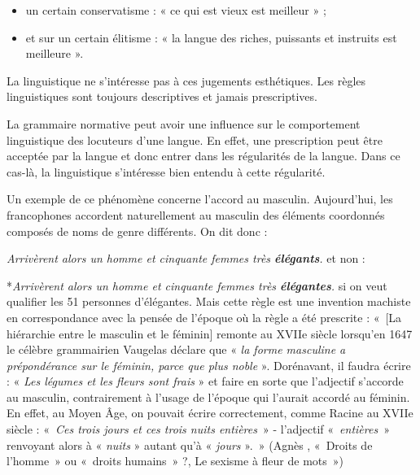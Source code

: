 {    \begin{itemize}
    \item un certain conservatisme : « ce qui est vieux est meilleur » ;
    \item et sur un certain élitisme : « la langue des riches, puissants et instruits est meilleure ».
    \end{itemize}

    La linguistique ne s’intéresse pas à ces jugements esthétiques. Les règles linguistiques sont toujours descriptives et jamais prescriptives.


    La grammaire normative peut avoir une influence sur le comportement linguistique des locuteurs d’une langue. En effet, une prescription peut être acceptée par la langue et donc entrer dans les régularités de la langue. Dans ce cas-là, la linguistique s’intéresse bien entendu à cette régularité.

    Un exemple de ce phénomène concerne l’accord au masculin. Aujourd’hui, les francophones accordent naturellement au masculin des éléments coordonnés composés de noms de genre différents. On dit donc :
    
    \ea
         \textit{{Arrivèrent alors un homme et cinquante femmes très} \textbf{{élégants}}.}
    \z
    et non :
    
    \ea
        *\textit{{Arrivèrent alors un homme et cinquante femmes très} \textbf{{élégantes}}.}
    \z
    si on veut qualifier les 51 personnes d’élégantes. Mais cette règle est une invention machiste en correspondance avec la pensée de l’époque où la règle a été prescrite : «~[La hiérarchie entre le masculin et le féminin] remonte au XVIIe siècle lorsqu’en 1647 le célèbre grammairien Vaugelas déclare que « \textit{la forme masculine a prépondérance sur le féminin, parce que plus noble} ». Dorénavant, il faudra écrire : « \textit{Les légumes et les fleurs sont frais} » et faire en sorte que l’adjectif s’accorde au masculin, contrairement à l’usage de l’époque qui l’aurait accordé au féminin. En effet, au Moyen Âge, on pouvait écrire correctement, comme Racine au XVIIe siècle : «~\textit{Ces trois jours et ces trois nuits entières}~» - l’adjectif «~\textit{entières}~» renvoyant alors à « \textit{nuits} » autant qu’à « \textit{jours} ».~» (Agnès \citet{callamard1998droits}, «~Droits de l’homme~» ou «~droits humains~» ?, Le sexisme à fleur de mots~»)
}
